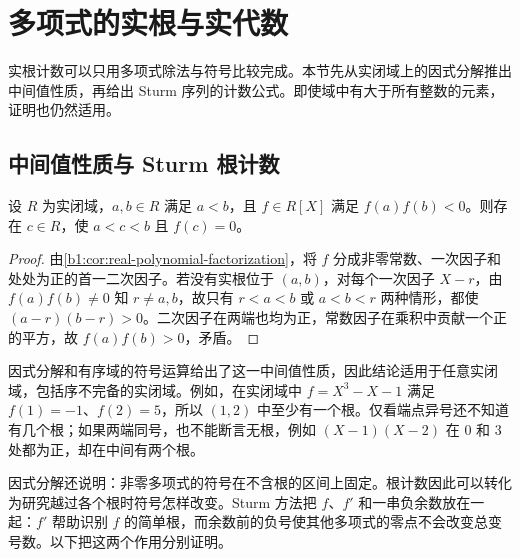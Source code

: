 
\section{多项式的实根与实代数}
\label{b1:sec:E03}

实根计数可以只用多项式除法与符号比较完成。本节先从实闭域上的因式分解推出中间值性质，再给出 Sturm 序列的计数公式。即使域中有大于所有整数的元素，证明也仍然适用。

%
%

\subsection{中间值性质与 Sturm 根计数}
\label{b1:subsec:E03:01}

\begin{theorem}[多项式中间值性质]\label{b1:thm:real-closed-ivt}
	设 \(R\) 为实闭域，\(a,b\in R\) 满足 \(a<b\)，且 \(f\in R[X]\) 满足 \(f(a)f(b)<0\)。则存在 \(c\in R\)，使 \(a<c<b\) 且 \(f(c)=0\)。
\end{theorem}

\begin{proof}
	由\cref{b1:cor:real-polynomial-factorization}，将 \(f\) 分成非零常数、一次因子和处处为正的首一二次因子。若没有实根位于 \((a,b)\)，对每个一次因子 \(X-r\)，由 \(f(a)f(b)\neq0\) 知 \(r\neq a,b\)，故只有 \(r<a<b\) 或 \(a<b<r\) 两种情形，都使 \((a-r)(b-r)>0\)。二次因子在两端也均为正，常数因子在乘积中贡献一个正的平方，故 \(f(a)f(b)>0\)，矛盾。
\end{proof}

因式分解和有序域的符号运算给出了这一中间值性质，因此结论适用于任意实闭域，包括序不完备的实闭域。例如，在实闭域中 \(f=X^3-X-1\) 满足 \(f(1)=-1\)、\(f(2)=5\)，所以 \((1,2)\) 中至少有一个根。仅看端点异号还不知道有几个根；如果两端同号，也不能断言无根，例如 \((X-1)(X-2)\) 在 \(0\) 和 \(3\) 处都为正，却在中间有两个根。

\ProseParagraphBreak
因式分解还说明：非零多项式的符号在不含根的区间上固定。根计数因此可以转化为研究越过各个根时符号怎样改变。Sturm 方法把 \(f\)、\(f'\) 和一串负余数放在一起：\(f'\) 帮助识别 \(f\) 的简单根，而余数前的负号使其他多项式的零点不会改变总变号数。以下把这两个作用分别证明。

